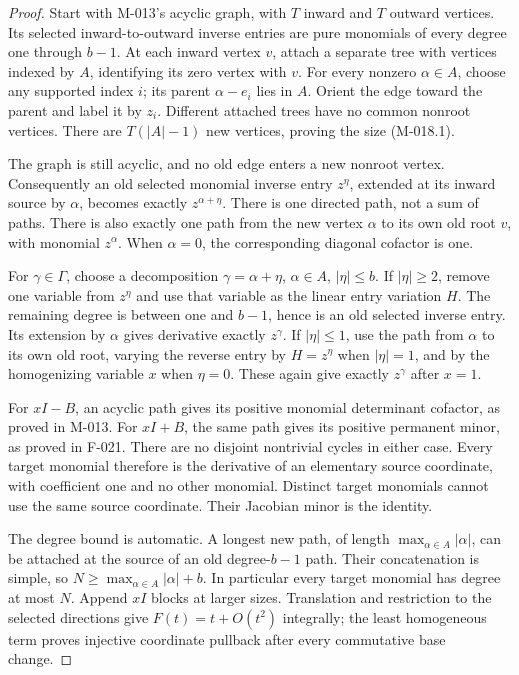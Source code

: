 \begin{proof}
Start with M-013's acyclic graph, with \(T\) inward and
\(T\) outward vertices. Its selected inward-to-outward inverse
entries are pure monomials of every degree one through \(b-1\).
At each inward vertex \(v\), attach a separate tree with vertices
indexed by \(A\), identifying its zero vertex with \(v\).
For every nonzero \(\alpha\in A\), choose any supported index
\(i\); its parent \(\alpha-e_i\) lies in \(A\).
Orient the edge toward the parent and label it by \(z_i\).
Different attached trees have no common nonroot vertices.
There are \(T(|A|-1)\) new vertices, proving the size (M-018.1).

The graph is still acyclic, and no old edge enters a new nonroot
vertex. Consequently an old selected monomial inverse entry
\(z^\eta\), extended at its inward source by \(\alpha\),
becomes exactly \(z^{\alpha+\eta}\). There is one directed
path, not a sum of paths. There is also exactly one path from
the new vertex \(\alpha\) to its own old root \(v\), with
monomial \(z^\alpha\). When \(\alpha=0\), the corresponding
diagonal cofactor is one.

For \(\gamma\in\Gamma\), choose a decomposition
\(\gamma=\alpha+\eta\), \(\alpha\in A\), \(|\eta|\leq b\).
If \(|\eta|\geq2\), remove one variable from \(z^\eta\)
and use that variable as the linear entry variation \(H\).
The remaining degree is between one and \(b-1\), hence is
an old selected inverse entry. Its extension by \(\alpha\)
gives derivative exactly \(z^\gamma\).
If \(|\eta|\leq1\), use the path from \(\alpha\) to its
own old root, varying the reverse entry by \(H=z^\eta\)
when \(|\eta|=1\), and by the homogenizing variable \(x\)
when \(\eta=0\). These again give exactly \(z^\gamma\)
after \(x=1\).

For \(xI-B\), an acyclic path gives its positive monomial
determinant cofactor, as proved in M-013. For \(xI+B\),
the same path gives its positive permanent minor, as proved
in F-021. There are no disjoint nontrivial cycles in either
case. Every target monomial therefore is the derivative of
an elementary source coordinate, with coefficient one and
no other monomial. Distinct target monomials cannot use the
same source coordinate. Their Jacobian minor is the identity.

The degree bound is automatic. A longest new path, of length
\(\max_{\alpha\in A}|\alpha|\), can be attached at the
source of an old degree-\(b-1\) path. Their concatenation
is simple, so \(N\geq\max_{\alpha\in A}|\alpha|+b\).
In particular every target monomial has degree at most \(N\).
Append \(xI\) blocks at larger sizes. Translation and restriction
to the selected directions give \(F(t)=t+O(t^2)\) integrally;
the least homogeneous term proves injective coordinate pullback
after every commutative base change.


\end{proof}
